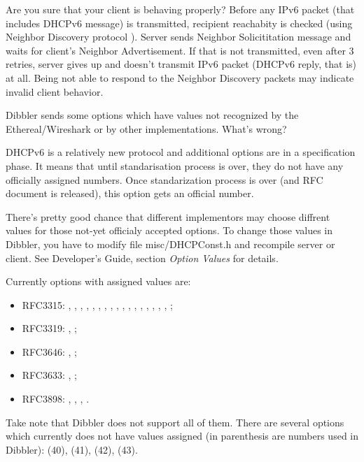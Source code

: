 \A Are you sure that your client is behaving properly? Before any IPv6
packet (that includes DHCPv6 message) is transmitted, recipient
reachabity is checked (using Neighbor Discovery protocol 
\cite{rfc2461}). Server sends Neighbor Solicititation message and
waits for client's Neighbor Advertisement. If that is not transmitted,
even after 3 retries, server gives up and doesn't transmit IPv6 packet
(DHCPv6 reply, that is) at all. Being not able to respond to the
Neighbor Discovery packets may indicate invalid client behavior. 

\Q Dibbler sends some options which have values not recognized by the
Ethereal/Wireshark or by other implementations. What's wrong?

\A DHCPv6 is a relatively new protocol and additional options are in a
specification phase. It means that until standarisation process is
over, they do not have any officially assigned numbers. Once
standarization process is over (and RFC document is released), this
option gets an official number. 

There's pretty good chance that different implementors may choose
diffrent values for those not-yet officialy accepted options. To
change those values in Dibbler, you have to modify file
misc/DHCPConst.h and recompile server or client. See Developer's
Guide, section \emph{Option Values} for details.

Currently options with assigned values are: 
\begin{itemize}
\item RFC3315: ,
, , , ,
, , ,
, , , ,
, , ,
, , ;
\item RFC3319:
, ;
\item RFC3646: ,
;
\item RFC3633: , ;
\item RFC3898:
, , ,
. 

\end{itemize}
Take note that Dibbler does not support all of
them. There are several options which currently does not have values
assigned (in parenthesis are numbers used in Dibbler):
 (40),  (41),  (42),
 (43).

